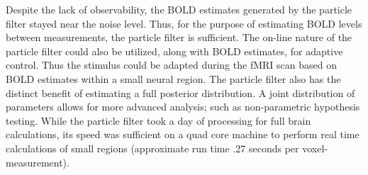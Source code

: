 \documentclass{article}
\begin{document}
Despite the lack of observability, the BOLD estimates generated 
by the particle filter stayed near the noise level. 
Thus, for the purpose of estimating BOLD levels between measurements,
the particle filter is sufficient. The on-line nature of the
particle filter could also be utilized, along with BOLD estimates,
for adaptive control. Thus the stimulus could be
adapted during the fMRI scan based on BOLD estimates within a small neural
region. The particle filter also has the distinct benefit of 
estimating a full posterior distribution. A joint distribution of 
parameters allows for more advanced analysis; such as 
non-parametric hypothesis testing.  
While the particle filter took a day of processing for full brain calculations, its speed
was sufficient on a quad core machine to perform real time calculations of small regions
(approximate run time .27 seconds per voxel-measurement). 



\end{document}
